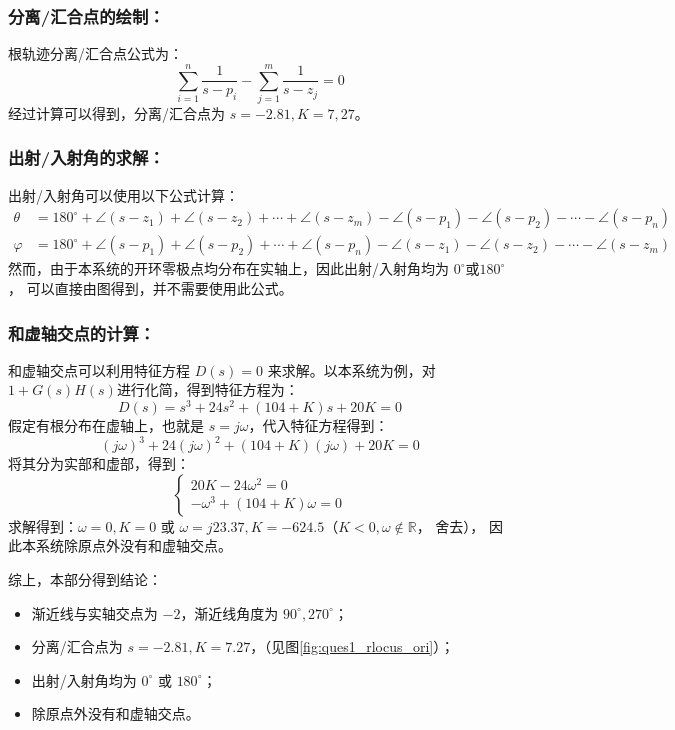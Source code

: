 \documentclass[../report.tex]{subfiles}
\begin{document}
\subsubsection{分离/汇合点的绘制：}
根轨迹分离/汇合点公式为：
\begin{equation}
    \sum_{i=1}^{n}\frac{1}{s - p_i} - \sum_{j=1}^{m}\frac{1}{s - z_j} = 0
\end{equation}
经过计算可以得到，分离/汇合点为 $s = -2.81, K = 7,27$。

\subsubsection{出射/入射角的求解：}
出射/入射角可以使用以下公式计算：
\begin{align}
    \theta &= 180^\circ + \angle(s - z_1) + \angle(s - z_2) + \cdots + \angle(s - z_m) - \angle(s - p_1) - \angle(s - p_2) - \cdots - \angle(s - p_n)
\\
    \varphi &= 180^\circ + \angle(s - p_1) + \angle(s - p_2) + \cdots + \angle(s - p_n) - \angle(s - z_1) - \angle(s - z_2) - \cdots - \angle(s - z_m)
\end{align}
然而，由于本系统的开环零极点均分布在实轴上，因此出射/入射角均为 $0^\circ$或$180^\circ$， 可以直接由图得到，并不需要使用此公式。

\subsubsection{和虚轴交点的计算：}
和虚轴交点可以利用特征方程 $D(s) = 0$ 来求解。以本系统为例，对$1+G(s)H(s)$进行化简，得到特征方程为：
\begin{equation}
    D(s) = s^3 + 24s^2 + (104+K)s + 20K = 0
\end{equation}
假定有根分布在虚轴上，也就是 $s = j\omega$，代入特征方程得到：
\begin{equation}
    (j\omega)^3 + 24(j\omega)^2 + (104+K)(j\omega) + 20K = 0
\end{equation}
将其分为实部和虚部，得到：
\begin{equation}
    \begin{cases}
        20K - 24\omega^2 = 0 \\
        -\omega^3 + (104+K)\omega = 0
    \end{cases}
\end{equation}
求解得到：$\omega = 0, K = 0$ 或 $\omega = j23.37, K = -624.5$（$K<0, \omega \notin \mathbb{R} $， 舍去），
因此本系统除原点外没有和虚轴交点。

综上，本部分得到结论：
\begin{itemize}
    \item 渐近线与实轴交点为 $-2$，渐近线角度为 $90^\circ, 270^\circ$；
    \item 分离/汇合点为 $s = -2.81, K = 7.27$，（见图\ref{fig:ques1_rlocus_ori}）；
    \item 出射/入射角均为 $0^\circ$ 或 $180^\circ$；
    \item 除原点外没有和虚轴交点。
\end{itemize}
\end{document}
